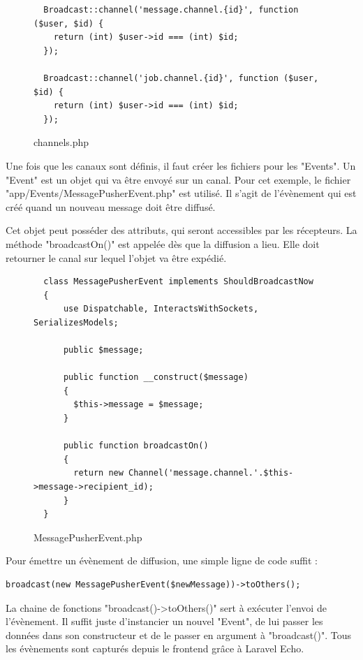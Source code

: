 \documentclass[
    iai, %
    eai, %
]{heig-tb}
\begin{document}
\begin{figure}[h]
  \begin{verbatim}
  Broadcast::channel('message.channel.{id}', function ($user, $id) {
    return (int) $user->id === (int) $id;
  });

  Broadcast::channel('job.channel.{id}', function ($user, $id) {
    return (int) $user->id === (int) $id;
  });
  \end{verbatim}
  \caption{channels.php}
\end{figure}

Une fois que les canaux sont définis, il faut créer les fichiers pour les "Events". Un "Event" est un objet qui va être envoyé sur un canal. Pour cet exemple, le fichier "app/Events/MessagePusherEvent.php" est utilisé. Il s'agit de l'évènement qui est créé quand un nouveau message doit être diffusé.

\newpage
Cet objet peut posséder des attributs, qui seront accessibles par les récepteurs. La méthode "broadcastOn()" est appelée dès que la diffusion a lieu. Elle doit retourner le canal sur lequel l'objet va être expédié.

\begin{figure}[h]
  \begin{verbatim}
  class MessagePusherEvent implements ShouldBroadcastNow
  {
      use Dispatchable, InteractsWithSockets, SerializesModels;

      public $message;

      public function __construct($message)
      {
        $this->message = $message;
      }

      public function broadcastOn()
      {
        return new Channel('message.channel.'.$this->message->recipient_id);
      }
  }
  \end{verbatim}
  \caption{MessagePusherEvent.php}
\end{figure}

Pour émettre un évènement de diffusion, une simple ligne de code suffit :
\begin{verbatim}
broadcast(new MessagePusherEvent($newMessage))->toOthers();
\end{verbatim}

La chaine de fonctions "broadcast()->toOthers()" sert à exécuter l'envoi de l'évènement. Il suffit juste d'instancier un nouvel "Event", de lui passer les données dans son constructeur et de le passer en argument à "broadcast()". Tous les évènements sont capturés depuis le frontend grâce à Laravel Echo.
\end{document}

